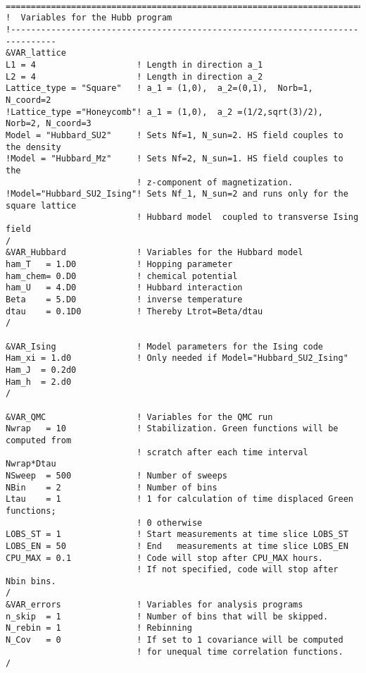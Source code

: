 \begin{lstlisting} 

===============================================================================
!  Variables for the Hubb program
!-------------------------------------------------------------------------------
&VAR_lattice
L1 = 4                    ! Length in direction a_1
L2 = 4                    ! Length in direction a_2
Lattice_type = "Square"	  ! a_1 = (1,0),  a_2=(0,1),  Norb=1, N_coord=2
!Lattice_type ="Honeycomb"! a_1 = (1,0),  a_2 =(1/2,sqrt(3)/2), Norb=2, N_coord=3
Model = "Hubbard_SU2"     ! Sets Nf=1, N_sun=2. HS field couples to the density
!Model = "Hubbard_Mz"     ! Sets Nf=2, N_sun=1. HS field couples to the 
                          ! z-component of magnetization.  
!Model="Hubbard_SU2_Ising"! Sets Nf_1, N_sun=2 and runs only for the square lattice
                          ! Hubbard model  coupled to transverse Ising field
/
&VAR_Hubbard              ! Variables for the Hubbard model
ham_T   = 1.D0            ! Hopping parameter
ham_chem= 0.D0            ! chemical potential
ham_U   = 4.D0            ! Hubbard interaction
Beta    = 5.D0            ! inverse temperature
dtau    = 0.1D0           ! Thereby Ltrot=Beta/dtau
/

&VAR_Ising                ! Model parameters for the Ising code
Ham_xi = 1.d0             ! Only needed if Model="Hubbard_SU2_Ising"
Ham_J  = 0.2d0
Ham_h  = 2.d0
/

&VAR_QMC                  ! Variables for the QMC run
Nwrap   = 10              ! Stabilization. Green functions will be computed from 
                          ! scratch after each time interval  Nwrap*Dtau
NSweep  = 500             ! Number of sweeps
NBin    = 2               ! Number of bins
Ltau    = 1               ! 1 for calculation of time displaced Green functions;
                          ! 0 otherwise
LOBS_ST = 1               ! Start measurements at time slice LOBS_ST
LOBS_EN = 50              ! End   measurements at time slice LOBS_EN
CPU_MAX = 0.1             ! Code will stop after CPU_MAX hours. 
                          ! If not specified, code will stop after Nbin bins.
/                          
&VAR_errors               ! Variables for analysis programs
n_skip  = 1               ! Number of bins that will be skipped. 
N_rebin = 1               ! Rebinning  
N_Cov   = 0               ! If set to 1 covariance will be computed
                          ! for unequal time correlation functions.                   
/            
\end{lstlisting}
%

